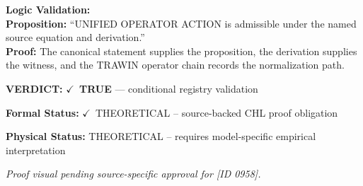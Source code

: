 \textbf{Logic Validation:}\\
\textbf{Proposition:} ``UNIFIED OPERATOR ACTION is admissible under the named source equation and derivation.''\\
\textbf{Proof:} The canonical statement supplies the proposition, the derivation supplies the witness, and the TRAWIN operator chain records the normalization path.

\textbf{VERDICT:} \ensuremath{\checkmark}\ \textbf{TRUE} --- conditional registry validation

\textbf{Formal Status:} \ensuremath{\checkmark}\ THEORETICAL -- source-backed CHL proof obligation

\textbf{Physical Status:} THEORETICAL -- requires model-specific empirical interpretation
\par\vspace{0.45em}
\par
\vfill
\begingroup\footnotesize\itshape
Proof visual pending source-specific approval for [ID 0958].
\par\endgroup
\vfill
\endgroup
\endgroup

